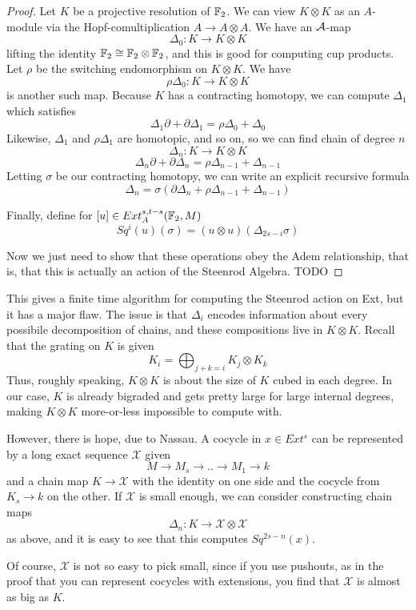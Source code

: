 \begin{proof}
  Let $K$ be a projective resolution of $\mathbb{F}_2$.
  We can view $K\otimes K$ as an $A$-module via the Hopf-comultiplication $A\to A\otimes A$.  
  We have an $\mathcal{A}$-map 
  \[\Delta_0:K\to K\otimes K\]
  lifting the identity $\mathbb{F}_2\cong \mathbb{F}_2\otimes \mathbb{F}_2$, and this is good for computing cup products. 
  Let $\rho$ be the switching endomorphism on $K\otimes K$.  
  We have
  \[\rho\Delta_0 : K\to K\otimes K\]
  is another such map.  
  Because $K$ has a contracting homotopy, we can compute $\Delta_1$ which satisfies
  \[\Delta_1\partial + \partial\Delta_1 = \rho\Delta_0+\Delta_0\]
  Likewise, $\Delta_1$ and $\rho\Delta_1$ are homotopic, and so on, so we can find chain of degree $n$
  \[\Delta_n :K\to K\otimes K\]
  \[\Delta_n\partial + \partial\Delta_n = \rho\Delta_{n-1}+\Delta_{n-1}\]
  Letting $\sigma$ be our contracting homotopy, we can write an explicit recursive formula
  \[\Delta_n = \sigma(\partial\Delta_n + \rho\Delta_{n-1}+\Delta_{n-1})\]
  
  Finally, define for $[u]\in Ext_A^{s,t-s}(\mathbb{F}_2,M)$
  \[Sq^i(u)(\sigma) = (u\otimes u)(\Delta_{2s-i}\sigma)\]

  Now we just need to show that these operations obey the Adem relationship, that is, that this is actually an action of the Steenrod Algebra.  TODO

  \end{proof}

This gives a finite time algorithm for computing the Steenrod action on Ext, but it has a major flaw.  The issue is that $\Delta_i$ encodes information about every possibile decomposition of chains, and these compositions live in $K\otimes K$.  
Recall that the grating on $K$ is given
\[K_i=\bigoplus_{j+k=i} K_j\otimes K_k\]
Thus, roughly speaking, $K\otimes K$ is about the size of $K$ cubed in each degree.  
In our case, $K$ is already bigraded and gets pretty large for large internal degrees, making $K\otimes K$ more-or-less impossible to compute with. 

However, there is hope, due to Nassau.  
A cocycle in $x\in Ext^s$ can be represented by a long exact sequence $\mathcal{X}$ given
\[M\to M_s\to ..\to M_1\to k\]
and a chain map $K\to \mathcal{X}$ with the identity on one side and the cocycle from $K_s\to k$ on the other.  
If $\mathcal{X}$ is small enough, we can consider constructing chain maps
\[\Delta_n : K\to \mathcal{X}\otimes\mathcal{X}\]
as above, and it is easy to see that this computes $Sq^{2s-n}(x)$.  

Of course, $\mathcal{X}$ is not so easy to pick small, since if you use pushouts, as in the proof that you can represent cocycles with extensions, you find that $\mathcal{X}$ is almost as big as $K$.  


